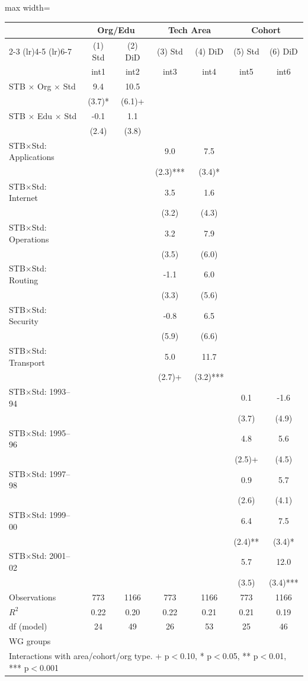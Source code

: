 \begin{adjustbox}{max width=\textwidth}
\begin{tabular}{lcccccc}
\toprule
 & \multicolumn{2}{c}{Org/Edu} & \multicolumn{2}{c}{Tech Area} & \multicolumn{2}{c}{Cohort} \\
\cmidrule(lr){2-3} \cmidrule(lr){4-5} \cmidrule(lr){6-7}
 & (1) Std & (2) DiD & (3) Std & (4) DiD & (5) Std & (6) DiD \\
\midrule
 & int1 & int2 & int3 & int4 & int5 & int6 \\
STB $\times$ Org $\times$ Std & 9.4 & 10.5 &  &  &  &  \\
 & (3.7)* & (6.1)+ &  &  &  &  \\
STB $\times$ Edu $\times$ Std & -0.1 & 1.1 &  &  &  &  \\
 & (2.4) & (3.8) &  &  &  &  \\
STB$\times$Std: Applications &  &  & 9.0 & 7.5 &  &  \\
 &  &  & (2.3)*** & (3.4)* &  &  \\
STB$\times$Std: Internet &  &  & 3.5 & 1.6 &  &  \\
 &  &  & (3.2) & (4.3) &  &  \\
STB$\times$Std: Operations &  &  & 3.2 & 7.9 &  &  \\
 &  &  & (3.5) & (6.0) &  &  \\
STB$\times$Std: Routing &  &  & -1.1 & 6.0 &  &  \\
 &  &  & (3.3) & (5.6) &  &  \\
STB$\times$Std: Security &  &  & -0.8 & 6.5 &  &  \\
 &  &  & (5.9) & (6.6) &  &  \\
STB$\times$Std: Transport &  &  & 5.0 & 11.7 &  &  \\
 &  &  & (2.7)+ & (3.2)*** &  &  \\
STB$\times$Std: 1993--94 &  &  &  &  & 0.1 & -1.6 \\
 &  &  &  &  & (3.7) & (4.9) \\
STB$\times$Std: 1995--96 &  &  &  &  & 4.8 & 5.6 \\
 &  &  &  &  & (2.5)+ & (4.5) \\
STB$\times$Std: 1997--98 &  &  &  &  & 0.9 & 5.7 \\
 &  &  &  &  & (2.6) & (4.1) \\
STB$\times$Std: 1999--00 &  &  &  &  & 6.4 & 7.5 \\
 &  &  &  &  & (2.4)** & (3.4)* \\
STB$\times$Std: 2001--02 &  &  &  &  & 5.7 & 12.0 \\
 &  &  &  &  & (3.5) & (3.4)*** \\
\midrule
Observations & 773 & 1166 & 773 & 1166 & 773 & 1166 \\
$R^2$ & 0.22 & 0.20 & 0.22 & 0.21 & 0.21 & 0.19 \\
df (model) & 24 & 49 & 26 & 53 & 25 & 46 \\
WG groups &  &  &  &  &  &  \\
\bottomrule
\multicolumn{7}{l}{\footnotesize Interactions with area/cohort/org type. + p$<$0.10, * p$<$0.05, ** p$<$0.01, *** p$<$0.001} \\
\end{tabular}
\end{adjustbox}
